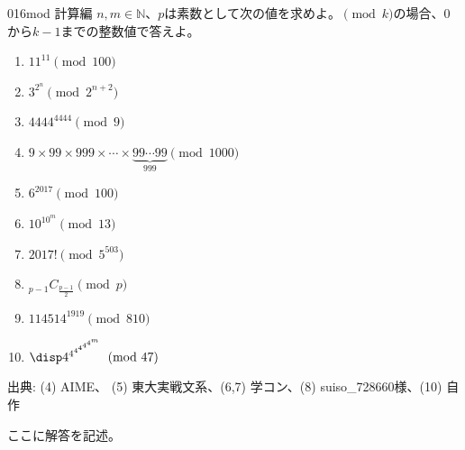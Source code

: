 \begin{prob}{016}{}{mod 計算編}
 $n,m\in\mathbb{N}$、$p$は素数として次の値を求めよ。$\pmod k$の場合、$0$から$k-1$までの整数値で答えよ。
 \begin{enumerate}
  \item $11^{11} \pmod {100}$
  \item $3^{2^n} \pmod {2^{n+2}}$
  \item $4444^{4444} \pmod 9$
  \item $9\times99\times999\times\cdots\times\underbrace{99\cdots99}_{999} \pmod {1000}$
  \item $6^{2017} \pmod {100}$
  \item $10^{10^m} \pmod {13}$
  \item $2017! \pmod 5^{503}$
  \item ${}_{p-1}C_{\frac{p-1}{2}} \pmod p$
  \item $114514^{1919} \pmod {810}$
  \item $\disp 4^{4^{4^{4^{4^{4^m}}}}} \pmod {47}$
 \end{enumerate}
 {\small 出典: (4) AIME、 (5) 東大実戦文系、(6,7) 学コン、(8) suiso\_728660様、(10) 自作}
\end{prob}
ここに解答を記述。